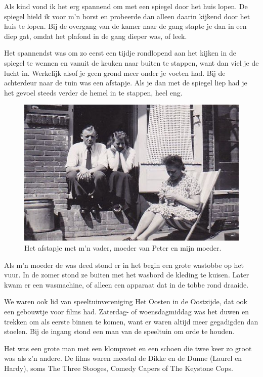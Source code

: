 \documentclass[12pt,twoside]{memoir}
\begin{document}
Als kind vond ik het erg spannend om met een spiegel door het huis lopen. De spiegel hield ik voor m’n borst en probeerde dan alleen daarin kijkend door het huis te lopen. Bij de overgang van de kamer naar de gang stapte je dan in een diep gat, omdat het plafond in de gang dieper was, of leek. 

Het spannendst was om zo eerst een tijdje rondlopend aan het kijken in de spiegel te wennen en vanuit de keuken naar buiten te stappen, want dan viel je de lucht in. Werkelijk alsof je geen grond meer onder je voeten had. Bij de achterdeur naar de tuin was een afstapje. Als je dan met de spiegel liep had je het gevoel steeds verder de hemel in te stappen, heel eng. 

\begin{figure}
\includegraphics[width=\textwidth]{img/ch5/gevonden_0009}
\caption*{\footnotesize Het afstapje met m’n vader, moeder van Peter en mijn moeder.}
\end{figure}

Als m’n moeder de was deed stond er in het begin een grote wastobbe op het vuur. In de zomer stond ze buiten met het wasbord de kleding te kuisen. Later kwam er een wasmachine, of alleen een apparaat dat in de tobbe rond draaide. 

We waren ook lid van speeltuinvereniging Het Oosten in de Oostzijde, dat ook een gebouwtje voor films had. Zaterdag- of woensdagmiddag was het duwen en trekken om als eerste binnen te komen, want er waren altijd meer gegadigden dan stoelen. Bij de ingang stond een man van de speeltuin om orde te houden. 

Het was een grote man met een klompvoet en een schoen die twee keer zo groot was als z’n andere. De films waren meestal de Dikke en de Dunne (Laurel en Hardy), soms The Three Stooges, Comedy Capers of The Keystone Cops. 
\end{document}
